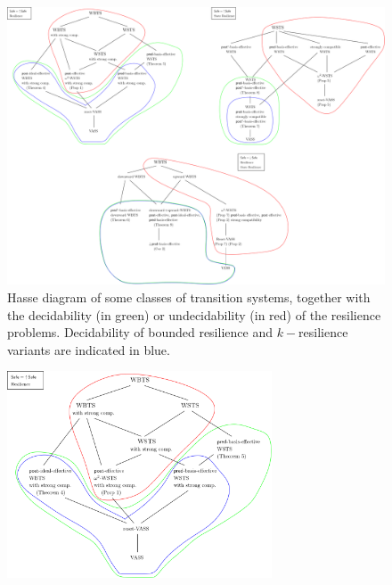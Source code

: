\documentclass[runningheads]{llncs}
\begin{document}
 \begin{center}
 	\begin{figure}
 	\hspace{-2.cm}
\includegraphics[width=1.40\textwidth]{All_results}
\caption{Hasse diagram of some classes of transition systems, together with the decidability (in green) or undecidability (in red) of the resilience problems. Decidability of bounded resilience and $k-$resilience variants are indicated in blue.}
	\end{figure}
\end{center}


\iffalse
 \begin{center}
	\begin{figure}
\includegraphics[width=0.70\textwidth]{Safe_up_R}
	\end{figure}
\end{center}
\end{document}
